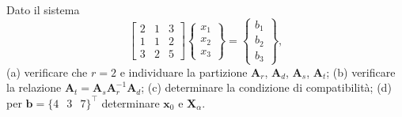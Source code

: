 \begin{esercizio} 
	Dato il sistema
	\begin{equation*}
		\begin{bmatrix} 2 & 1 & 3 \\ 1 & 1 & 2 \\ 3 & 2 & 5 \end{bmatrix}
		\begin{Bmatrix} x_1 \\ x_2 \\ x_3 \end{Bmatrix}
		= \begin{Bmatrix} b_1 \\ b_2 \\ b_3 \end{Bmatrix},
	\end{equation*}
	(a) verificare che $r=2$ e individuare la partizione
	$\bm{A}_r$, $\bm{A}_d$, $\bm{A}_s$, $\bm{A}_t$;
	(b) verificare la relazione
	$\bm{A}_t=\bm{A}_s\bm{A}_r^{-1}\bm{A}_d$;
	(c) determinare la condizione di compatibilit\`a;
	(d) per $\bm{b}=\{4\,\;\;3\,\;\;7\}^\top$ determinare $\bm{x}_0$ e
	$\bm{X}_\alpha$.
\end{esercizio}
